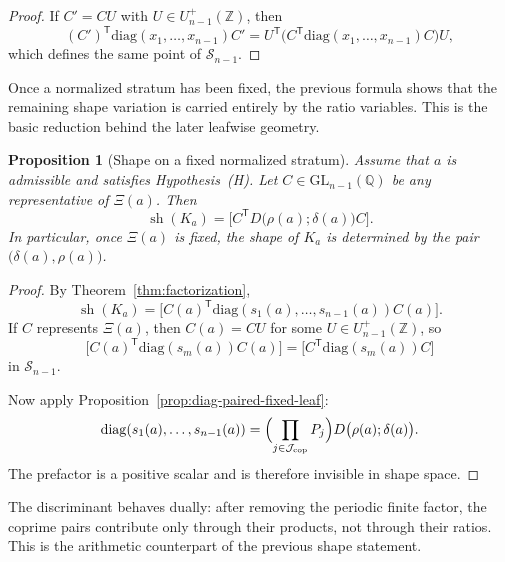 \documentclass[11pt,letterpaper]{amsart}
\newcommand{\Q}{\mathbb{Q}}
\newcommand{\Z}{\mathbb{Z}}
\newcommand{\GL}{\mathrm{GL}}
\newcommand{\diag}{\mathrm{diag}}
\theoremstyle{plain}
\newtheorem{proposition}[theorem]{Proposition}
\theoremstyle{definition}
\begin{document}
\begin{proof}
If \(C'=CU\) with \(U\in U_{n-1}^+(\Z)\), then
\[
(C')^{\mathsf T}\diag(x_1,\dots,x_{n-1})C'
=
U^{\mathsf T}\bigl(C^{\mathsf T}\diag(x_1,\dots,x_{n-1})C\bigr)U,
\]
which defines the same point of \(\mathscr S_{n-1}\).
\end{proof}

Once a normalized stratum has been fixed, the previous formula shows that the remaining shape variation is carried entirely by the ratio variables. This is the basic reduction behind the later leafwise geometry.

\begin{proposition}[Shape on a fixed normalized stratum]
\label{prop:shape-on-fixed-leaf}
Assume that \(a\) is admissible and satisfies Hypothesis~\textup{(H)}.
Let \(C\in \GL_{n-1}(\Q)\) be any representative of \(\Xi(a)\).
Then
\begin{equation}\label{eq:shape-on-fixed-leaf}
\operatorname{sh}(K_a)
=
\bigl[C^{\mathsf T}D\bigl(\rho(a);\delta(a)\bigr)C\bigr].
\end{equation}
In particular, once \(\Xi(a)\) is fixed, the shape of \(K_a\) is determined by
the pair \(\bigl(\delta(a),\rho(a)\bigr)\).
\end{proposition}

\begin{proof}
By Theorem~\ref{thm:factorization},
\[
\operatorname{sh}(K_a)
=
\bigl[
C(a)^{\mathsf T}\diag(s_1(a),\dots,s_{n-1}(a))C(a)
\bigr].
\]
If \(C\) represents \(\Xi(a)\), then \(C(a)=CU\) for some
\(U\in U_{n-1}^+(\Z)\), so
\[
\bigl[
C(a)^{\mathsf T}\diag(s_m(a))C(a)
\bigr]
=
\bigl[
C^{\mathsf T}\diag(s_m(a))C
\bigr]
\]
in \(\mathscr S_{n-1}\).

Now apply Proposition~\ref{prop:diag-paired-fixed-leaf}:
\[
\diag(s_1(a),\dots,s_{n-1}(a))
=
\Bigl(\prod_{j\in \mathcal J_{\mathrm{cop}}}P_j\Bigr)
D\bigl(\rho(a);\delta(a)\bigr).
\]
The prefactor is a positive scalar and is therefore invisible in shape space.
\end{proof}

The discriminant behaves dually: after removing the periodic finite factor, the coprime pairs contribute only through their products, not through their ratios. This is the arithmetic counterpart of the previous shape statement.
\end{document}
